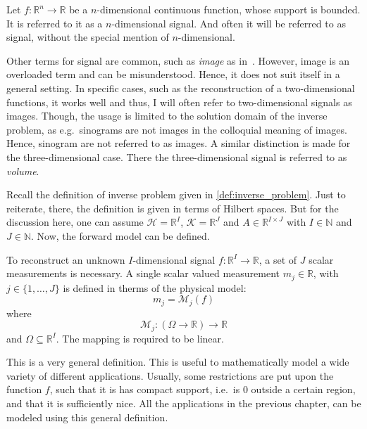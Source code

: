 \begin{definition}[Signal]\label{def:signal}
	Let \(f\colon \mathbb{R}^n \to \mathbb{R}\) be a \(n\)-dimensional continuous function,
	whose support is bounded. It is referred to it as a \(n\)-dimensional signal. And often it
	will be referred to as signal, without the special mention of \(n\)-dimensional.
\end{definition}

Other terms for signal are common, such as \textit{image} as in~\cite{herman_basis_2015}. However,
image is an overloaded term and can be misunderstood. Hence, it does not suit itself in a general
setting. In specific cases, such as the reconstruction of a two-dimensional functions, it works well
and thus, I will often refer to two-dimensional signals as images. Though, the usage is limited to
the solution domain of the inverse problem, as e.g.\ sinograms are not images in the colloquial
meaning of images. Hence, sinogram are not referred to as images. A similar distinction is made for
the three-dimensional case. There the three-dimensional signal is referred to as \textit{volume}.

Recall the definition of inverse problem given in \autoref{def:inverse_problem}. Just to reiterate,
there, the definition is given in terms of Hilbert spaces. But for the discussion here, one can
assume \(\mathcal{H} = \mathbb{R}^I\), \(\mathcal{K} = \mathbb{R}^J\) and \(A \in
\mathbb{R}^{I\times J}\) with \(I \in \mathbb{N}\) and \(J \in \mathbb{N}\). Now, the forward model
can be defined.

\begin{definition}\label{def:forward-model}
	To reconstruct an unknown \(I\)-dimensional signal \(f: \mathbb{R}^I \to \mathbb{R}\), a set
	of \(J\) scalar measurements is necessary. A single scalar valued measurement \(m_j \in
	\mathbb{R}\), with \(j \in \{1, \dots, J\}\) is defined in therms of the physical model:
	\[ m_j = \mathscr{M}_j(f)\]
	where
	\[ \mathscr{M}_j\colon (\Omega \to \mathbb{R}) \to \mathbb{R} \]
	and \(\Omega \subseteq \mathbb{R}^I\). The mapping is required to be linear.
\end{definition}

This is a very general definition. This is useful to mathematically model a wide variety of
different applications. Usually, some restrictions are put upon the function \(f\), such that it is
has compact support, i.e.\ is \(0\) outside a certain region, and that it is sufficiently nice. All
the applications in the previous chapter, can be modeled using this general definition.

